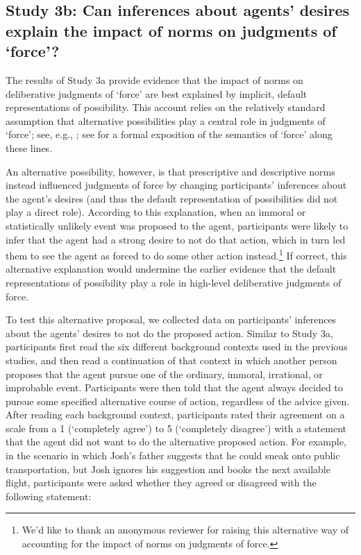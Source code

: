 \documentclass[11pt,letterpaper]{article}
\begin{document}
\subsection*{Study 3b: Can inferences about agents' desires explain the impact of norms on judgments of `force'?}

The results of Study 3a provide evidence that the impact of norms on deliberative judgments of `force' are best explained by implicit, default representations of possibility. This account relies on the relatively standard assumption that alternative possibilities play a central role in judgments of `force'; see, e.g., \cite{aquinas1952summa,rowe2002nicomachean}; see \cite{mandlekern2017force} for a formal exposition of the semantics of `force' along these lines. 

An alternative possibility, however, is that prescriptive and descriptive norms instead influenced judgments of force by changing participants' inferences about the agent's desires (and thus the default representation of possibilities did not play a direct role). According to this explanation, when an immoral or statistically unlikely event was proposed to the agent, participants were likely to infer that the agent had a strong desire to not do that action, which in turn led them to see the agent as forced to do some other action instead.\footnote{We'd like to thank an anonymous reviewer for raising this alternative way of accounting for the impact of norms on judgments of force.} If correct, this alternative explanation would undermine the earlier evidence that the default representations of possibility play a role in high-level deliberative judgments of force. 

To test this alternative proposal, we collected data on participants' inferences about the agents' desires to not do the proposed action. Similar to Study 3a, participants first read the six different background contexts used in the previous studies, and then read a continuation of that context in which another person proposes that the agent pursue one of the ordinary, immoral, irrational, or improbable event. Participants were then told that the agent always decided to pursue some specified alternative course of action, regardless of the advice given. After reading each background context, participants rated their agreement on a scale from a 1 (`completely agree') to 5 (`completely disagree') with a statement that the agent did not want to do the alternative proposed action. For example, in the scenario in which Josh's father suggests that he could sneak onto public transportation, but Josh ignores his suggestion and books the next available flight, participants were asked whether they agreed or disagreed with the following statement:
\end{document}
